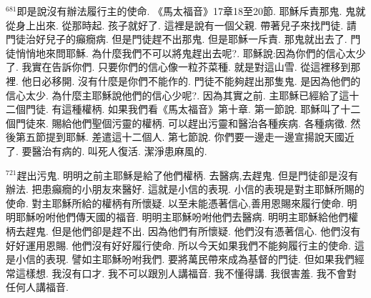 \documentclass{book}
\begin{document}
$^{681}$即是說沒有辦法履行主的使命.
《馬太福音》17章18至20節.
耶穌斥責那鬼.
鬼就從身上出來.
從那時起.
孩子就好了.
這裡是說有一個父親.
帶著兒子來找門徒.
請門徒治好兒子的癲癇病.
但是門徒趕不出那鬼.
但是耶穌一斥責.
那鬼就出去了.
門徒悄悄地來問耶穌.
為什麼我們不可以將鬼趕出去呢?.
耶穌說:因為你們的信心太少了.
我實在告訴你們.
只要你們的信心像一粒芥菜種.
就是對這山雪.
從這裡移到那裡.
他日必移開.
沒有什麼是你們不能作的.
門徒不能夠趕出那隻鬼.
是因為他們的信心太少.
為什麼主耶穌說他們的信心少呢?.
因為其實之前.
主耶穌已經給了這十二個門徒.
有這種權柄.
如果我們看《馬太福音》第十章.
第一節說.
耶穌叫了十二個門徒來.
賜給他們聖個污靈的權柄.
可以趕出污靈和醫治各種疾病.
各種病徵.
然後第五節提到耶穌.
差遣這十二個人.
第七節說.
你們要一邊走一邊宣揚說天國近了.
要醫治有病的.
叫死人復活.
潔淨患麻風的.

$^{721}$趕出污鬼.
明明之前主耶穌是給了他們權柄.
去醫病,去趕鬼.
但是門徒卻是沒有辦法.
把患癲癇的小朋友來醫好.
這就是小信的表現.
小信的表現是對主耶穌所賜的使命.
對主耶穌所給的權柄有所懷疑.
以至未能憑著信心,善用恩賜來履行使命.
明明耶穌吩咐他們傳天國的福音.
明明主耶穌吩咐他們去醫病.
明明主耶穌給他們權柄去趕鬼.
但是他們卻是趕不出.
因為他們有所懷疑.
他們沒有憑著信心.
他們沒有好好運用恩賜.
他們沒有好好履行使命.
所以今天如果我們不能夠履行主的使命.
這是小信的表現.
譬如主耶穌吩咐我們.
要將萬民帶來成為基督的門徒.
但如果我們經常這樣想.
我沒有口才.
我不可以跟別人講福音.
我不懂得講.
我很害羞.
我不會對任何人講福音.
\newpage

\allsectionsfont{\centering}

\setlength\parindent{0pt}
\setlength{\columnsep}{1.25em}
\setlength{\parfillskip}{0pt}
\setlength{\tabcolsep}{1em}
\raggedbottom



\newfontfamily{}
\newfontfamily{}
\newfontfamily{}
\newfontfamily{}
\newfontfamily{}
\newcommand{\chfont}[1]{\centerfont{\huge\textcolor{hcolor}{#1}}}
\newcommand{\leftcitation}[1]{\leftcitationfont{\Large\textcolor{hcolor}{#1}}}
\newcommand{\rightcitation}[1]{\rightcitationfont{\normalsize\textcolor{rcolor}{#1}}}
\newfontfamily{}
\end{document}
